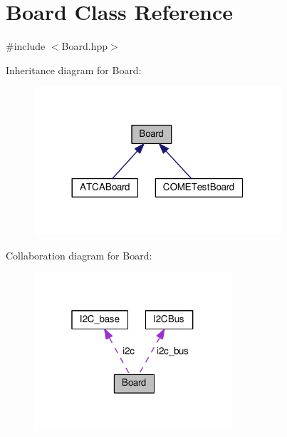 \hypertarget{class_board}{}\section{Board Class Reference}
\label{class_board}


{\ttfamily \#include $<$Board.\+hpp$>$}



Inheritance diagram for Board\+:\nopagebreak
\begin{figure}[H]
\begin{center}
\leavevmode
\includegraphics[width=260pt]{class_board__inherit__graph}
\end{center}
\end{figure}


Collaboration diagram for Board\+:\nopagebreak
\begin{figure}[H]
\begin{center}
\leavevmode
\includegraphics[width=208pt]{class_board__coll__graph}
\end{center}
\end{figure}
